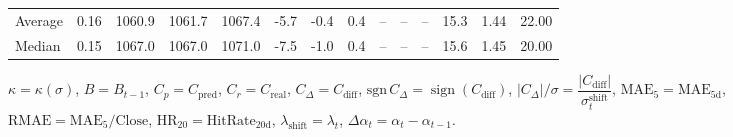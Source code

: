 \begin{threeparttable}
{\begin{tabular}{lrrrrrrrrrrrrr}
Average &     0.16 & 1060.9 & 1061.7 & 1067.4 &       -5.7 &                     -0.4 &                 0.4 &         -- &        -- &             -- &             15.3 &            1.44 &                  22.00 \\
 Median &     0.15 & 1067.0 & 1067.0 & 1071.0 &       -7.5 &                     -1.0 &                 0.4 &         -- &        -- &             -- &             15.6 &            1.45 &                  20.00 \\
\bottomrule
\end{tabular}
}
\begin{tablenotes}\footnotesize
\item $\kappa=\kappa(\sigma)$, $B=B_{t-1}$, $C_p=C_{\text{pred}}$, $C_r=C_{\text{real}}$, $C_\Delta=C_{\text{diff}}$, $\mathrm{sgn}\,C_\Delta=\operatorname{sign}(C_{\text{diff}})$, $|C_\Delta|/\sigma=\dfrac{|C_{\text{diff}}|}{\sigma_t^{\text{shift}}}$, $\mathrm{MAE}_5=\mathrm{MAE}_{5\text{d}}$, $\mathrm{RMAE}= \mathrm{MAE}_5 / \text{Close}$, $\mathrm{HR}_{20}=\mathrm{HitRate}_{20\text{d}}$, 
$\lambda_{\text{shift}}=\lambda_t$, 
$\Delta\alpha_t=\alpha_t-\alpha_{t-1}$.
\end{tablenotes}
\end{threeparttable}
\endgroup

